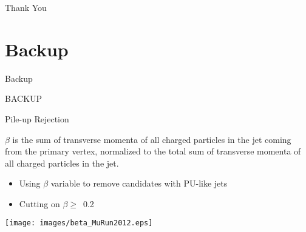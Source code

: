 \begin{frame}
\begin{center}
\huge
Thank You
\end{center}
\end{frame}


\section*{Backup}


\begin{frame}{Backup}

\begin{center}
BACKUP

\end{center}
\end{frame}

\begin{frame}{Pile-up Rejection}
\begin{center}
 $\beta$ is the sum of transverse momenta of all charged particles in the jet coming from the primary vertex, normalized to the total sum of transverse momenta of all charged particles in the jet.
 \begin{itemize}
  \item
    Using $\beta$ variable to remove candidates with PU-like jets 
  \item
    Cutting on $\beta \geq$~0.2
  \end{itemize}

\texttt{[image: images/beta\_MuRun2012.eps]}
\end{center}
\end{frame}

